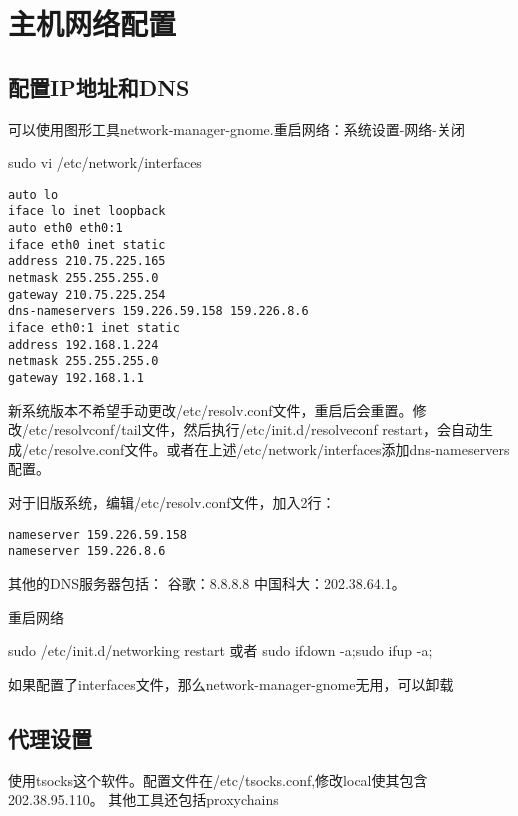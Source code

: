 \section{主机网络配置}
\subsection{配置IP地址和DNS}
可以使用图形工具network-manager-gnome.重启网络：系统设置-网络-关闭
\begin{shellcmd}
sudo vi /etc/network/interfaces 
\end{shellcmd}
\begin{verbatim}
auto lo
iface lo inet loopback
auto eth0 eth0:1
iface eth0 inet static
address 210.75.225.165
netmask 255.255.255.0
gateway 210.75.225.254
dns-nameservers 159.226.59.158 159.226.8.6
iface eth0:1 inet static
address 192.168.1.224
netmask 255.255.255.0
gateway 192.168.1.1
\end{verbatim}

新系统版本不希望手动更改/etc/resolv.conf文件，重启后会重置。修改/etc/resolvconf/tail文件，然后执行/etc/init.d/resolveconf restart，会自动生成/etc/resolve.conf文件。或者在上述/etc/network/interfaces添加dns-nameservers配置。

对于旧版系统，编辑/etc/resolv.conf文件，加入2行： 
\begin{verbatim}
nameserver 159.226.59.158
nameserver 159.226.8.6
\end{verbatim}
其他的DNS服务器包括：
谷歌：8.8.8.8
中国科大：202.38.64.1。


重启网络
\begin{shellcmd}
sudo /etc/init.d/networking restart
或者 sudo ifdown -a;sudo ifup -a;
\end{shellcmd}
如果配置了interfaces文件，那么network-manager-gnome无用，可以卸载

\subsection{代理设置}
使用tsocks这个软件。配置文件在/etc/tsocks.conf,修改local使其包含202.38.95.110。
其他工具还包括proxychains



